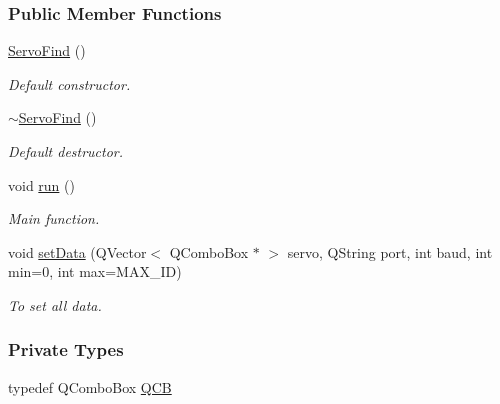 \subsubsection*{Public Member Functions}
\begin{DoxyCompactItemize}
\item 
\hyperlink{a00008_ad9b1d82aecc71025fb606b79b9bf6ce1}{Servo\+Find} ()
\begin{DoxyCompactList}\small\item\em Default constructor. \end{DoxyCompactList}\item 
\hyperlink{a00008_a5f353598d5d40289c039412288e5bf73}{$\sim$\+Servo\+Find} ()
\begin{DoxyCompactList}\small\item\em Default destructor. \end{DoxyCompactList}\item 
void \hyperlink{a00008_a4edb0ac2852a93f84c6aa04d5953e28d}{run} ()
\begin{DoxyCompactList}\small\item\em Main function. \end{DoxyCompactList}\item 
void \hyperlink{a00008_a440f961980162cfd7c2ca9031b2a76e8}{set\+Data} (Q\+Vector$<$ Q\+Combo\+Box $\ast$ $>$ servo, Q\+String port, int baud, int min=0, int max=M\+A\+X\+\_\+\+I\+D)
\begin{DoxyCompactList}\small\item\em To set all data. \end{DoxyCompactList}\end{DoxyCompactItemize}
\subsubsection*{Private Types}
\begin{DoxyCompactItemize}
\item 
typedef Q\+Combo\+Box \hyperlink{a00008_a8cfdbef4d4dc51f1b200a885ff827711}{Q\+C\+B}
\end{DoxyCompactItemize}
